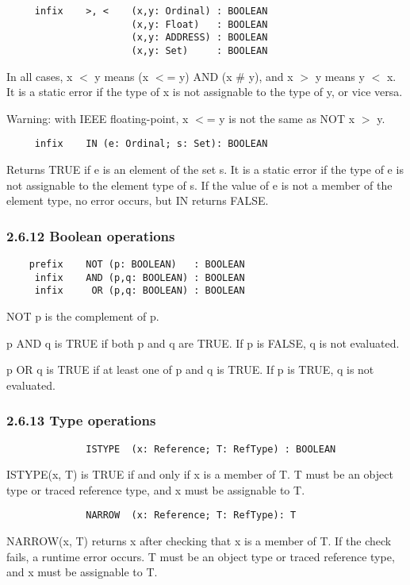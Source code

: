 \documentclass[10pt]{article}
\begin{document}
\begin{verbatim}
     infix    >, <    (x,y: Ordinal) : BOOLEAN
                      (x,y: Float)   : BOOLEAN
                      (x,y: ADDRESS) : BOOLEAN
                      (x,y: Set)     : BOOLEAN
\end{verbatim}
In all cases, x $<$ y means (x $<$= y) AND (x \# y), and x $>$ y means y $<$
x.  It is a static error if the type of x is not assignable to the type of y,
or vice versa.

Warning: with IEEE floating-point, x $<$= y is not the same as NOT x $>$ y.

\begin{verbatim}
     infix    IN (e: Ordinal; s: Set): BOOLEAN
\end{verbatim}
Returns TRUE if e is an element of the set s.  It is a static error if the
type of e is not assignable to the element type of s.  If the value of e is
not a member of the element type, no error occurs, but IN returns FALSE.

\subsubsection*{2.6.12 Boolean operations}

\begin{verbatim}
    prefix    NOT (p: BOOLEAN)   : BOOLEAN
     infix    AND (p,q: BOOLEAN) : BOOLEAN
     infix     OR (p,q: BOOLEAN) : BOOLEAN
\end{verbatim}
NOT p is the complement of p.

p AND q is TRUE if both p and q are TRUE.  If p is FALSE, q is not evaluated.

p OR q is TRUE if at least one of p and q is TRUE.  If p is TRUE, q is not
evaluated.

\subsubsection*{2.6.13 Type operations}

\begin{verbatim}
              ISTYPE  (x: Reference; T: RefType) : BOOLEAN
\end{verbatim}
ISTYPE(x, T) is TRUE if and only if x is a member of T.  T must be an object
type or traced reference type, and x must be assignable to T.
\begin{verbatim}
              NARROW  (x: Reference; T: RefType): T
\end{verbatim}
NARROW(x, T) returns x after checking that x is a member of T.  If the check
fails, a runtime error occurs.  T must be an object type or traced reference
type, and x must be assignable to T.
\end{document}
